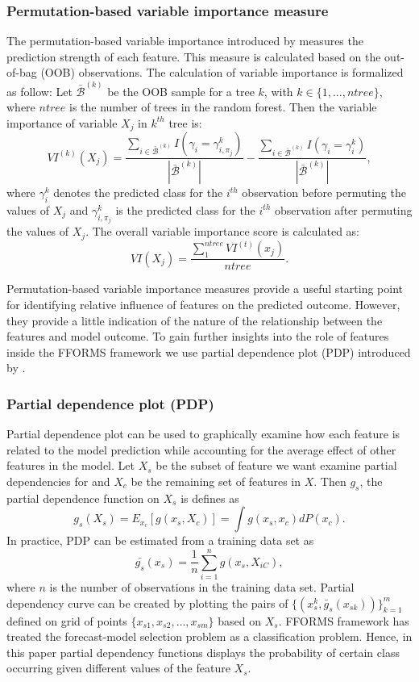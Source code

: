 \documentclass[11pt,a4paper,]{article}
\begin{document}
\subsubsection{Permutation-based variable importance
measure}\label{permutation-based-variable-importance-measure}

The permutation-based variable importance introduced by
\textcite{breiman2001random} measures the prediction strength of each
feature. This measure is calculated based on the out-of-bag (OOB)
observations. The calculation of variable importance is formalized as
follow: Let \(\bar{\mathcal{B}}^{(k)}\) be the OOB sample for a tree
\(k\), with \(k\in \{1,...,ntree\}\), where \(ntree\) is the number of
trees in the random forest. Then the variable importance of variable
\(X_{j}\) in \(k^{th}\) tree is:
\[VI^{(k)}(X_{j})=\frac{\sum_{i\in \bar{\mathcal{B}}^{(k)}}I(\gamma_{i}=\gamma_{i,\pi_{j}}^{k})}{|\bar{\mathcal{B}}^{(k)}|}-\frac{\sum_{i\in \bar{\mathcal{B}}^{(k)}}I(\gamma_{i}=\gamma_{i}^{k})}{|\bar{\mathcal{B}}^{(k)}|},\]
where \(\gamma_{i}^{k}\) denotes the predicted class for the \(i^{th}\)
observation before permuting the values of \(X_{j}\) and
\(\gamma_{i, \pi_{j}}^{k}\) is the predicted class for the \(i^{th}\)
observation after permuting the values of \(X_{j}\). The overall
variable importance score is calculated as:
\[VI(X_{j})=\frac{\sum_{1}^{ntree}VI^{(t)}(x_{j})}{ntree}.\]

Permutation-based variable importance measures provide a useful starting
point for identifying relative influence of features on the predicted
outcome. However, they provide a little indication of the nature of the
relationship between the features and model outcome. To gain further
insights into the role of features inside the FFORMS framework we use
partial dependence plot (PDP) introduced by
\textcite{friedman2008predictive}.

\subsubsection{Partial dependence plot
(PDP)}\label{partial-dependence-plot-pdp}

Partial dependence plot can be used to graphically examine how each
feature is related to the model prediction while accounting for the
average effect of other features in the model. Let \(X_s\) be the subset
of feature we want examine partial dependencies for and \(X_c\) be the
remaining set of features in \(X\). Then \(g_s\), the partial dependence
function on \(X_s\) is defines as
\[g_s(X_s)=E_{x_c}[g(x_s, X_c)]=\int{g(x_s, x_c)dP(x_c).}\] In practice,
PDP can be estimated from a training data set as
\[\bar{g_s}(x_s)=\frac{1}{n}\sum_{i=1}^{n}g(x_s, X_{iC}),\] where \(n\)
is the number of observations in the training data set. Partial
dependency curve can be created by plotting the pairs of
\(\{(x_s^k, \bar{g}_s(x_{sk}))\}_{k=1}^{m}\) defined on grid of points
\(\{x_{s1}, x_{s2},\dots, x_{sm}\}\) based on \(X_s\). FFORMS framework
has treated the forecast-model selection problem as a classification
problem. Hence, in this paper partial dependency functions displays the
probability of certain class occurring given different values of the
feature \(X_s\).
\end{document}
